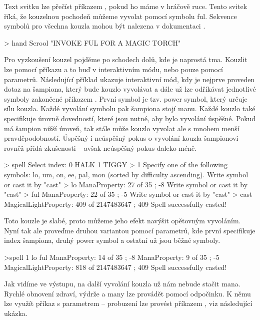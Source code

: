 Text svitku lze přečíst příkazem , pokud ho máme 
v hráčově ruce. Tento svitek říká, že kouzelnou pochodeň můžeme vyvolat pomocí symbolu ful.
Sekvence symbolů pro všechna kouzla mohou být nalezena v dokumentaci \cite{DMSpells}.

\begin{code}
> hand
Scrool "INVOKE FUL FOR A MAGIC TORCH"
\end{code}

Pro vyzkoušení kouzel
pojděme po schodech dolů, kde je naprostá tma. Kouzlit lze pomocí příkazu  a to buď v interaktivním módu,
nebo pouze pomocí parametrů. Následující příklad ukazuje interaktivní mód, kdy je nejprve proveden dotaz
na šampiona, který bude kouzlo vyvolávat a dále už lze odříkávat jednotlivé symboly zakončené příkazem
. První symbol je tzv. power symbol, který určuje sílu kouzla. Každé vyvolání symbolu pak šampiona stojí manu. 
Každé kouzlo také specifikuje úrovně dovedností, které jsou nutné, aby bylo vyvolání úspěšné. Pokud má šampion
nižší úroveň, tak stále může kouzlo vyvolat ale s mnohem menší pravděpodobností. Úspěšný i neúspěšný pokus
o vyvolání kouzla šampionovi rovněž přidá zkušenosti -- avšak neúspěšný pokus daleko méně.

\begin{code}
> spell 
Select index:
0 HALK
1 TIGGY
> 1
Specify one of the following symbols: lo, um, on, ee, 
pal, mon (sorted by difficulty ascending).
Write symbol or cast it by "cast"
> lo
ManaProperty: 27 of 35 ; -8
Write symbol or cast it by "cast"
> ful
ManaProperty: 22 of 35 ; -5
Write symbol or cast it by "cast"
> cast
MagicalLightProperty: 409 of 2147483647 ; 409
Spell successfully casted!
\end{code}

Toto kouzle je slabé, proto můžeme jeho efekt navýšit opětovným vyvoláním.
Nyní tak ale proveďme druhou variantou pomocí parametrů, kde 
první specifikuje index šampiona, druhý power symbol a ostatní už jsou běžné symboly.

\begin{code}
>spell 1 lo ful
ManaProperty: 14 of 35 ; -8
ManaProperty: 9 of 35 ; -5
MagicalLightProperty: 818 of 2147483647 ; 409
Spell successfully casted!
\end{code}

Jak vidíme ve výstupu, na další vyvolání kouzla už nám nebude stačit mana. Rychlé obnovení zdraví, výdrže
a many lze provádět pomocí odpočinku. K němu lze využít příkaz  s parametrem  --
probuzení lze provést příkazem , viz následující ukázka.

